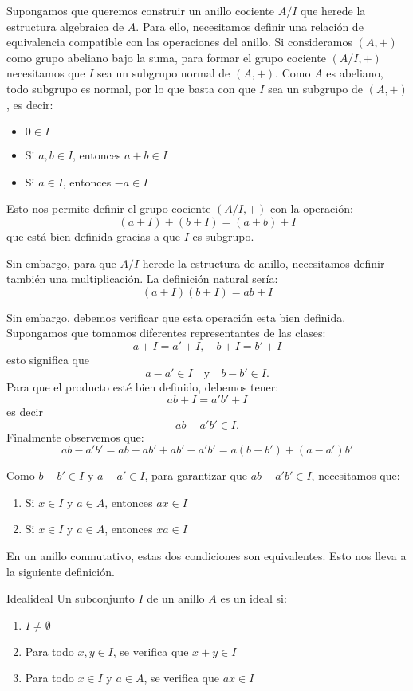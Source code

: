 Supongamos que queremos construir un anillo cociente $A/I$ que herede la estructura algebraica de $A$. Para ello, necesitamos definir una relación de equivalencia compatible con las operaciones del anillo. Si consideramos $(A,+)$ como grupo abeliano bajo la suma, para formar el grupo cociente $(A/I,+)$ necesitamos que $I$ sea un subgrupo normal de $(A,+)$. Como $A$ es abeliano, todo subgrupo es normal, por lo que basta con que $I$ sea un subgrupo de $(A,+)$, es decir:
\begin{itemize}
    \item $0 \in I$
    \item Si $a,b \in I$, entonces $a+b \in I$
    \item Si $a \in I$, entonces $-a \in I$
\end{itemize}

Esto nos permite definir el grupo cociente $(A/I,+)$ con la operación:
\[
(a+I) + (b+I) = (a+b) + I
\]
que está bien definida gracias a que $I$ es subgrupo.

Sin embargo, para que $A/I$ herede la estructura de anillo, necesitamos definir también una multiplicación. La definición natural sería:
\[
(a+I)(b+I) = ab + I
\]

Sin embargo, debemos verificar que esta operación esta bien definida. Supongamos que tomamos diferentes representantes de las clases:
\[
a + I = a' + I, \quad b + I = b' + I
\]
esto significa que
\[
a - a' \in I \quad \text{y} \quad b - b' \in I.
\]
Para que el producto esté bien definido, debemos tener:
\[
ab + I = a'b' + I
\]
es decir
\[
ab - a'b' \in I.
\]
Finalmente observemos que:
\[
ab - a'b' = ab - ab' + ab' - a'b' = a(b-b') + (a-a')b'
\]

Como $b-b' \in I$ y $a-a' \in I$, para garantizar que $ab - a'b' \in I$, necesitamos que:
\begin{enumerate}
    \item Si $x \in I$ y $a \in A$, entonces $ax \in I$
    \item Si $x \in I$ y $a \in A$, entonces $xa \in I$
\end{enumerate}
En un anillo conmutativo, estas dos condiciones son equivalentes. Esto nos lleva a la siguiente definición.

\begin{definition}{Ideal}{ideal}
    Un subconjunto \(I\) de un anillo \(A\) es un {ideal} si:
    \begin{enumerate}
        \item \(I \neq \emptyset\)
        \item Para todo \(x, y \in I\), se verifica que \(x + y \in I\)
        \item Para todo \(x \in I\) y \(a \in A\), se verifica que \(ax \in I\)
    \end{enumerate}
\end{definition}

